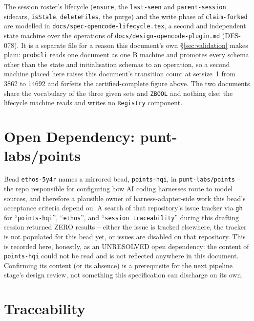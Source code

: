 \documentclass[a4paper,10pt,fleqn]{article}
\newcommand{\fpath}[1]{\texttt{#1}}
\newcommand{\field}[1]{\texttt{#1}}
\begin{document}
The session roster's lifecycle (\field{ensure}, the \fpath{last-seen} and
\fpath{parent-session} sidecars, \field{isStale}, \field{deleteFiles}, the
purge) and the write phase of \field{claim-forked} are modelled in
\fpath{docs/spec-opencode-lifecycle.tex}, a second and independent state
machine over the operations of \fpath{docs/design-opencode-plugin.md}
(DES-078). It is a separate file for a reason this document's own
\S\ref{sec:validation} makes plain: \texttt{probcli} reads one document as
one B machine and promotes every schema other than the state and
initialisation schemas to an operation, so a second machine placed here
raises this document's transition count at setsize~1 from 3862 to 14692 and
forfeits the certified-complete figure above. The two documents share the
vocabulary of the three given sets and \field{ZBOOL} and nothing else; the
lifecycle machine reads and writes no \field{Registry} component.

\section{Open Dependency: punt-labs/points}
\label{sec:open-dependency}

Bead \field{ethos-5y4r} names a mirrored bead, \field{points-hqi}, in
\fpath{punt-labs/points} -- the repo responsible for configuring how AI
coding harnesses route to model sources, and therefore a plausible
owner of harness-adapter-side work this bead's acceptance criteria
depend on. A search of that repository's issue tracker via \field{gh}
for ``\field{points-hqi}'', ``\field{ethos}'', and ``\field{session
traceability}'' during this drafting session returned ZERO results --
either the issue is tracked elsewhere, the tracker is not populated for
this bead yet, or issues are disabled on that repository. This is
recorded here, honestly, as an UNRESOLVED open dependency: the content
of \field{points-hqi} could not be read and is not reflected anywhere
in this document. Confirming its content (or its absence) is a
prerequisite for the next pipeline stage's design review, not something
this specification can discharge on its own.

\section{Traceability}
\label{sec:trace}
\end{document}
